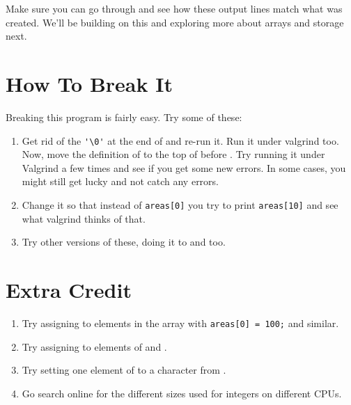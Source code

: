 Make sure you can go through and see how these output lines match
what was created.  We'll be building on this and exploring more
about arrays and storage next.

\section{How To Break It}

Breaking this program is fairly easy.  Try some of these:

\begin{enumerate}
\item Get rid of the \verb|'\0'| at the end of 
    and re-run it.  Run it under valgrind too.  Now, move the definition
    of  to the top of  before .
    Try running it under Valgrind a few times and see if you get some 
    new errors.  In some cases, you might still get lucky and not catch
    any errors.
\item Change it so that instead of \verb|areas[0]| you try to
    print \verb|areas[10]| and see what valgrind thinks of that.
\item Try other versions of these, doing it to  and
     too.
\end{enumerate}

\section{Extra Credit}

\begin{enumerate}
\item Try assigning to elements in the  array with \verb|areas[0] = 100;| and similar.
\item Try assigning to elements of  and .
\item Try setting one element of  to a character from .
\item Go search online for the different sizes used for integers on different
    CPUs.
\end{enumerate}

